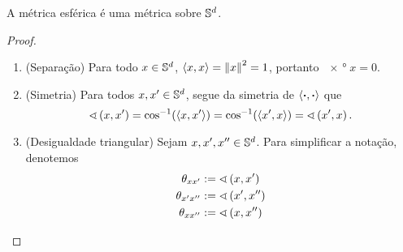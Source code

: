 \begin{proposition}
A métrica esférica é uma métrica sobre $\S^d$.
\end{proposition}
\begin{proof}
	\begin{enumerate}
	\item (Separação) Para todo $x \in \S^d$, $\inte{x}{x} = \nor{x}^2 = 1$, portanto $\ang{x}{x} = 0$.

	\item (Simetria) Para todos $x, x' \in \S^d$, segue da simetria de $\inte{\var}{\var}$ que
		\begin{equation*}
		\ang{x}{x'} = \cos\inv(\inte{x}{x'}) = \cos\inv(\inte{x'}{x}) = \ang{x'}{x}.
		\end{equation*}

	\item (Desigualdade triangular) Sejam $x,x',x'' \in \S^d$. Para simplificar a notação, denotemos
		\begin{align*}
		\theta_{xx'} &:= \ang{x}{x'} \\
		\theta_{x'x''} &:= \ang{x'}{x''} \\
		\theta_{xx''} &:= \ang{x}{x''} \\
		\end{align*}


\end{enumerate}
\end{proof}
